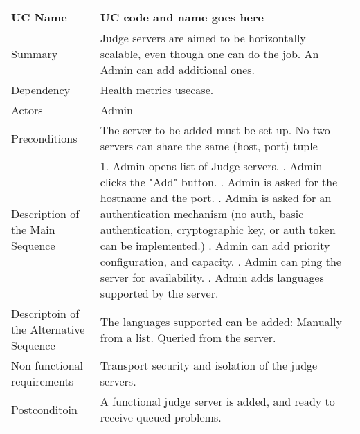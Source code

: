 \begin{table}[htbp]
\centering
\begin{tabularx}{\textwidth}{|l|X|}
\hline
UC Name & UC code and name goes here \\ \hline

Summary &  Judge servers are aimed to be horizontally scalable, even though one can do the job. An Admin can add additional ones. \\ \hline

Dependency & \- Health metrics usecase. \\ \hline

Actors & Admin \\ \hline

Preconditions & \- The server to be added must be set up. \newline \- No two servers can share the same (host, port) tuple \\ \hline

Description of the Main Sequence & 1. Admin opens list of Judge servers. \newline 2. Admin clicks the "Add" button. \newline 3. Admin is asked for the hostname and the port. \newline 4. Admin is asked for an authentication mechanism (no auth, basic authentication, cryptographic key, or auth token can be implemented.) \newline 5. Admin can add priority configuration, and capacity. \newline 6. Admin can ping the server for availability. \newline 7. Admin adds languages supported by the server. \\ \hline

Descriptoin of the Alternative Sequence & The languages supported can be added: \newline \- Manually from a list. \newline \- Queried from the server. \\ \hline

Non functional requirements & \- Transport security and isolation of the judge servers. \newline \\ \hline

Postconditoin & A functional judge server is added, and ready to receive queued problems. \\ \hline

\end{tabularx}
\end{table}

